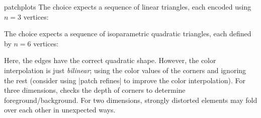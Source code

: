 {\begin{pgfplotslibrary}{patchplots}
The choice  expects a sequence of linear triangles, each
encoded using $n=3$ vertices:
%
\begin{codeexample}[]
\end{codeexample}

The choice  expects a sequence of isoparametric
quadratic triangles, each defined by $n=6$ vertices:
%
\begin{codeexample}[]
\end{codeexample}

\begin{codeexample}[]
\end{codeexample}

\noindent Here, the edges have the correct quadratic shape. However, the color
interpolation is just \emph{bilinear}; using the color values of the corners
and ignoring the rest (consider using |patch refines| to improve the color
interpolation). For three dimensions, \PGFPlots{} checks the depth of corners
to determine foreground/background. For two dimensions, strongly distorted
elements may fold over each other in unexpected ways.


\end{pgfplotslibrary}}
